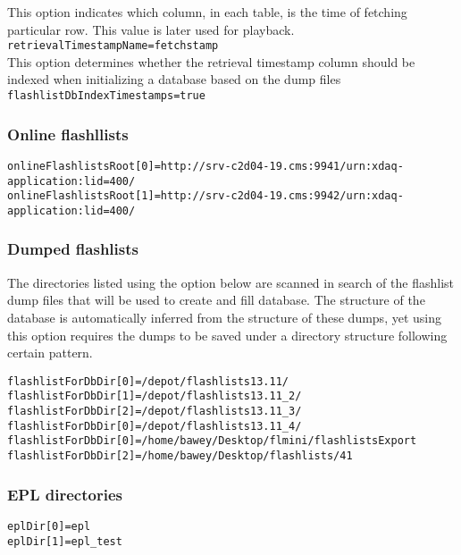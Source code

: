 This option indicates which column, in each table, is the time of fetching particular row. This value is later used for playback. \\
\texttt{retrievalTimestampName=fetchstamp} \\

This option determines whether the retrieval timestamp column should be indexed when initializing a database based on the dump files \\
\texttt{flashlistDbIndexTimestamps=true} \\

\subsubsection{Online flashllists}

\texttt{onlineFlashlistsRoot[0]=http://srv-c2d04-19.cms:9941/urn:xdaq-application:lid=400/} \\
\texttt{onlineFlashlistsRoot[1]=http://srv-c2d04-19.cms:9942/urn:xdaq-application:lid=400/} \\

\subsubsection{Dumped flashlists}\label{subsec:dumps}
The directories listed using the option below are scanned in search of the flashlist dump files that will be used to create and fill database. The structure of the database is automatically inferred from the structure of these dumps, yet using this option requires the dumps to be saved under a directory structure following certain pattern. 

\texttt{flashlistForDbDir[0]=/depot/flashlists13.11/} \\
\texttt{flashlistForDbDir[1]=/depot/flashlists13.11\_2/} \\
\texttt{flashlistForDbDir[2]=/depot/flashlists13.11\_3/} \\
\texttt{flashlistForDbDir[0]=/depot/flashlists13.11\_4/} \\
\texttt{flashlistForDbDir[0]=/home/bawey/Desktop/flmini/flashlistsExport} \\
\texttt{flashlistForDbDir[2]=/home/bawey/Desktop/flashlists/41} \\


\subsubsection{EPL directories}
\texttt{eplDir[0]=epl} \\
\texttt{eplDir[1]=epl\_test}\\


